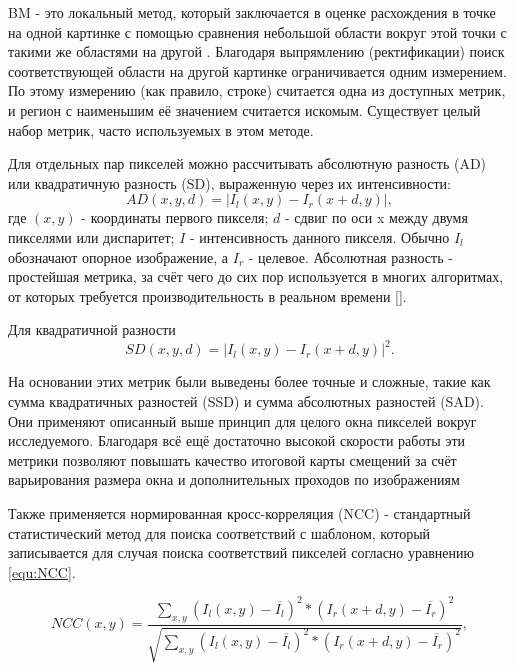 BM - это локальный метод, который заключается в оценке расхождения в точке на одной картинке с помощью сравнения небольшой области вокруг этой точки с такими же областями 
на другой \cite{}. Благодаря выпрямлению (ректификации) поиск соответствующей области на другой картинке ограничивается одним измерением. По этому измерению (как правило, строке) 
считается одна из доступных метрик, и регион с наименьшим её значением считается искомым. Существует целый набор метрик, часто используемых в этом методе. 

Для отдельных пар пикселей можно рассчитывать абсолютную разность (AD) или квадратичную разность (SD), выраженную через их интенсивности:
\begin{equation}
	AD(x, y, d) = |I_l(x,y) - I_r(x+d, y)|,			
	\label{eq:AD}
\end{equation}
где $(x, y)$ - координаты первого пикселя; $d$ - сдвиг по оси x между двумя пикселями или диспаритет; $I$ - интенсивность данного пикселя. Обычно $I_l$ обозначают опорное изображение, а $I_r$ - 
целевое. Абсолютная разность - простейшая метрика, за счёт чего до сих пор используется в многих алгоритмах, от которых требуется производительность в реальном времени []. 

Для квадратичной разности 
\begin{equation}
	SD(x, y, d) = |I_l(x,y) - I_r(x+d, y)|^2.		
	\label{eq:SD}
\end{equation}

На основании этих метрик были выведены более точные и сложные, такие как сумма квадратичных разностей (SSD) и сумма абсолютных разностей (SAD). Они применяют описанный выше принцип для целого 
окна пикселей вокруг исследуемого.  Благодаря всё ещё достаточно высокой скорости работы эти метрики позволяют повышать качество итоговой карты смещений за счёт варьирования размера окна и 
дополнительных проходов по изображениям \cite{twosizewindow} 

Также применяется нормированная кросс-корреляция (NCC) - стандартный статистический метод для поиска соответствий с шаблоном, который записывается для случая поиска соответствий пикселей 
согласно уравнению \ref{equ:NCC}.

\begin{equation}
	NCC(x, y) = \frac{ \sum_{x, y}^{} (I_l(x, y) - \overline{I_l} )^2 * ( I_r(x + d, y) - \overline{I_r} )^2   }{ \sqrt{ \sum_{x, y}^{} (I_l(x, y) - \overline{I_l} )^2 * ( I_r(x + d, y) - \overline{I_r} )^2 }  }, 
	\label{equ:NCC}
\end{equation}

